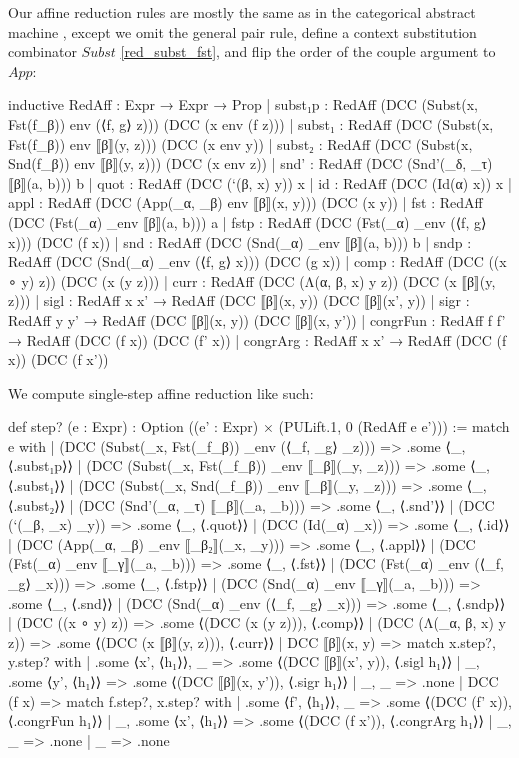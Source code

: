 \documentclass{article}
\begin{document}
Our affine reduction rules are mostly the same as in the categorical abstract machine \autocite{cmachine}, except we omit the general pair rule, define a context substitution combinator \(Subst\) \eqref{red_subst_fst}, and flip the order of the couple argument to \(App\):

\begin{leancode}
inductive RedAff : Expr → Expr → Prop
  | subst₁p  : RedAff (DCC (Subst(x, Fst(f_β)) env (⟨f, g⟩ z))) (DCC (x env (f z)))
  | subst₁   : RedAff (DCC (Subst(x, Fst(f_β)) env ⟦β⟧(y, z))) (DCC (x env y))
  | subst₂   : RedAff (DCC (Subst(x, Snd(f_β)) env ⟦β⟧(y, z))) (DCC (x env z))
  | snd'     : RedAff (DCC (Snd'(_δ, _τ) ⟦β⟧(a, b))) b
  | quot     : RedAff (DCC (`(β, x) y)) x
  | id       : RedAff (DCC (Id(α) x)) x
  | appl     : RedAff (DCC (App(_α, _β) env ⟦β⟧(x, y))) (DCC (x y))
  | fst      : RedAff (DCC (Fst(_α) _env ⟦β⟧(a, b))) a
  | fstp     : RedAff (DCC (Fst(_α) _env (⟨f, g⟩ x))) (DCC (f x))
  | snd      : RedAff (DCC (Snd(_α) _env ⟦β⟧(a, b))) b
  | sndp     : RedAff (DCC (Snd(_α) _env (⟨f, g⟩ x))) (DCC (g x))
  | comp     : RedAff (DCC ((x ∘ y) z)) (DCC (x (y z)))
  | curr     : RedAff (DCC (Λ(α, β, x) y z)) (DCC (x ⟦β⟧(y, z)))
  | sigl     : RedAff x x' → RedAff (DCC ⟦β⟧(x, y)) (DCC ⟦β⟧(x', y))
  | sigr     : RedAff y y' → RedAff (DCC ⟦β⟧(x, y)) (DCC ⟦β⟧(x, y'))
  | congrFun : RedAff f f' → RedAff (DCC (f x)) (DCC (f' x))
  | congrArg : RedAff x x' → RedAff (DCC (f x)) (DCC (f x'))
\end{leancode}

We compute single-step affine reduction like such:

\begin{leancode}
def step? (e : Expr) : Option ((e' : Expr) × (PULift.{1, 0} (RedAff e e'))) :=
  match e with
  | (DCC (Subst(_x, Fst(_f_β)) _env (⟨_f, _g⟩ _z))) => .some ⟨_, ⟨.subst₁p⟩⟩
  | (DCC (Subst(_x, Fst(_f_β)) _env ⟦_β⟧(_y, _z))) => .some ⟨_, ⟨.subst₁⟩⟩
  | (DCC (Subst(_x, Snd(_f_β)) _env ⟦_β⟧(_y, _z))) => .some ⟨_, ⟨.subst₂⟩⟩
  | (DCC (Snd'(_α, _τ) ⟦_β⟧(_a, _b)))              => .some ⟨_, ⟨.snd'⟩⟩
  | (DCC (`(_β, _x) _y))                           => .some ⟨_, ⟨.quot⟩⟩
  | (DCC (Id(_α) _x))                              => .some ⟨_, ⟨.id⟩⟩
  | (DCC (App(_α, _β) _env ⟦_β₂⟧(_x, _y)))         => .some ⟨_, ⟨.appl⟩⟩
  | (DCC (Fst(_α) _env ⟦_γ⟧(_a, _b)))              => .some ⟨_, ⟨.fst⟩⟩
  | (DCC (Fst(_α) _env (⟨_f, _g⟩ _x)))             => .some ⟨_, ⟨.fstp⟩⟩
  | (DCC (Snd(_α) _env ⟦_γ⟧(_a, _b)))              => .some ⟨_, ⟨.snd⟩⟩
  | (DCC (Snd(_α) _env (⟨_f, _g⟩ _x)))             => .some ⟨_, ⟨.sndp⟩⟩
  | (DCC ((x ∘ y) z))                              => .some ⟨(DCC (x (y z))), ⟨.comp⟩⟩
  | (DCC (Λ(_α, β, x) y z))                        => .some ⟨(DCC (x ⟦β⟧(y, z))), ⟨.curr⟩⟩
  | DCC ⟦β⟧(x, y) =>
    match x.step?, y.step? with
    | .some ⟨x', ⟨h₁⟩⟩, _ => .some ⟨(DCC ⟦β⟧(x', y)), ⟨.sigl h₁⟩⟩
    | _, .some ⟨y', ⟨h₁⟩⟩ => .some ⟨(DCC ⟦β⟧(x, y')), ⟨.sigr h₁⟩⟩
    | _, _ => .none
  | DCC (f x) =>
    match f.step?, x.step? with
    | .some ⟨f', ⟨h₁⟩⟩, _ => .some ⟨(DCC (f' x)), ⟨.congrFun h₁⟩⟩
    | _, .some ⟨x', ⟨h₁⟩⟩ => .some ⟨(DCC (f x')), ⟨.congrArg h₁⟩⟩
    | _, _ => .none
  | _ => .none
\end{leancode}
\end{document}
